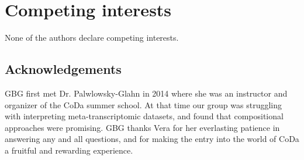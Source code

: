 \documentclass[graybox]{svmult}
\providecommand{\DIFaddbegin}{} %
\providecommand{\DIFaddend}{} %
\providecommand{\DIFdelbegin}{} %
\providecommand{\DIFdelend}{} %
\begin{document}
\section{Competing interests}

None of the authors declare competing interests.

\subsection*{Acknowledgements}
GBG first met Dr. Palwlowsky-Glahn in 2014 where she was an instructor and organizer of the CoDa summer school. At that time our group was struggling with interpreting meta-transcriptomic datasets, and found that compositional approaches were promising. GBG thanks Vera for her everlasting patience in answering any and all questions, and for making the entry into the world of CoDa a fruitful and rewarding experience.

\DIFdelbegin %
\DIFdelend \DIFaddbegin 
\DIFaddend 

%
\end{document}
